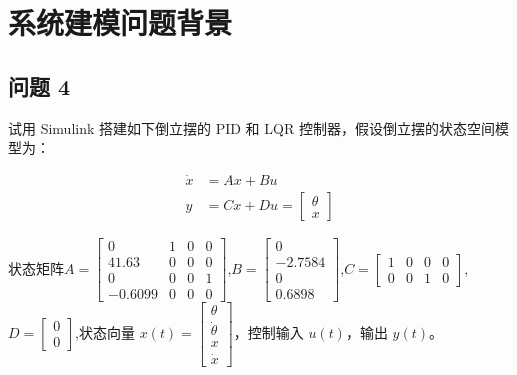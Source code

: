 \documentclass{article}
\begin{document}
\section*{系统建模问题背景}
\subsection*{问题 4}

试用 Simulink 搭建如下倒立摆的 PID 和 LQR 控制器，假设倒立摆的状态空间模型为：

\begin{align*}
\dot{x} &= Ax+Bu \\
y &= Cx+Du=\left[\begin{matrix}
    \theta\\x
\end{matrix}\right]
\end{align*}

状态矩阵\(A=\left[\begin{matrix}
    0&1&0&0\\41.63&0&0&0\\0&0&0&1\\-0.6099&0&0&0
\end{matrix}\right]\),\(B=\left[\begin{matrix}
    0\\-2.7584\\0\\0.6898
\end{matrix}\right]\),\(C=\left[\begin{matrix}
    1&0&0&0\\0&0&1&0
\end{matrix}\right]\),\(D=\left[\begin{matrix}
    0\\0
\end{matrix}\right]\),状态向量 \( x(t) = \begin{bmatrix} \theta \\ \dot{\theta} \\ x \\\dot{x} \end{bmatrix} \)，控制输入 \( u(t) \)，输出 \( y(t) \)。
\end{document}

